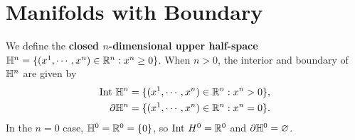 
\section{Manifolds with Boundary}
We define the \textbf{closed $n$-dimensional upper half-space} $\mathbb{H}^n = \{(x^1, \cdots, x^n) \in \mathbb{R}^n: x^n \geq 0\}$. When $n>0$, the interior and boundary of $\mathbb{H}^n$ are given by 
\begin{align*}
    \mathrm{Int~} \mathbb{H}^n &= \{(x^1, \cdots, x^n) \in \mathbb{R}^n: x^n > 0\},       \\
    \partial \mathbb{H}^n &= \{(x^1, \cdots, x^n) \in \mathbb{R}^n: x^n = 0\}.
\end{align*}
In the $n=0$ case, $\mathbb{H}^0 = \mathbb{R}^0 = \{0\}$, so $\mathrm{Int~} H^0 = \mathbb{R}^0$ and $\partial \mathbb{H}^0 = \varnothing$. 